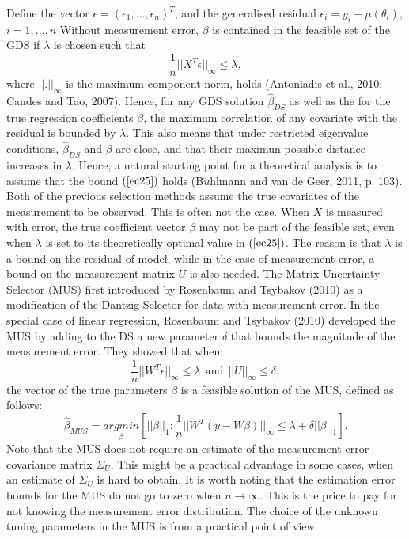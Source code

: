 \documentclass[a4paper,12pt,openany]{report}
\theoremstyle{plain}
\theoremstyle{plain}
\theoremstyle{plain}
\theoremstyle{plain}
\theoremstyle{plain}
\theoremstyle{plain}
\theoremstyle{plain}
\theoremstyle{plain}
\theoremstyle{plain}
\theoremstyle{plain}
\theoremstyle{plain}
\theoremstyle{plain}
\begin{document}
Define the vector $\epsilon = (\epsilon_1, \dots, \epsilon_n)^T$, and the generalised residual $\epsilon_i = y_i-\mu(\theta_i)$, $i=1,\dots, n$ Without measurement error, $\beta$ is contained in the feasible set of the GDS if $\lambda$ is chosen such that
\begin{equation}\label{ec25}
\frac{1}{n}||X^T\epsilon||_{\infty}\leq \lambda,
\end{equation}
where $||.||_{\infty}$ is the maximum component norm, holds (Antoniadis et al., 2010; Candes and Tao, 2007). Hence, for any GDS solution $\hat{\beta}_{DS}$ as well as the for the true regression coefficients $\beta$, the maximum correlation of any covariate with the residual is bounded by $\lambda$. This also means that under restricted eigenvalue conditions, $\hat{\beta}_{DS}$ and $\beta$ are close, and that their maximun possible distance increases in $\lambda$. Hence, a natural starting point for a theoretical analysis is to assume that the bound $(\ref{ec25})$ holds (B$\ddot{u}$hlmann and van de Geer, 2011, p. 103).  Both of the previous selection methods assume the true covariates of the measurement to be observed.  This is often not the case. When $X$ is measured with error, the true coefficient vector $\beta$ may not be part of the feasible set, even when $\lambda$ is set to its theoretically optimal value in $(\ref{ec25})$. The reason is that $\lambda$ is a bound on the residual of model, while in the case of measurement error, a bound on the measurement matrix $U$ is also needed. The Matrix Uncertainty Selector (MUS) first introduced by Rosenbaum and Tsybakov (2010) as a modification of the Dantzig Selector for data with measurement error. In the special case of linear regression, Rosenbaum and Tsybakov (2010) developed the MUS by adding to the DS a new parameter $\delta$ that bounds the magnitude of the measurement error. They showed that when:
\begin{equation}\label{eq:bound}
\frac{1}{n}||W^T\epsilon||_{\infty}\leq \lambda \ \ \text{and} \ \  ||U||_{\infty} \leq \delta,
\end{equation}
the vector of the true parameters $\beta$ is a feasible solution of the MUS, defined as follows:
\begin{equation}
\hat{\beta}_{MUS} = \underset{\beta}{argmin}\left[||\beta||_1 :  \frac{1}{n}||W^T(y-W\beta)||_{\infty} \leq \lambda + \delta||\beta||_1\right]. 
\end{equation}
Note that the MUS does not require an estimate of the measurement error covariance matrix $\Sigma_U$. This
might be a practical advantage in some cases, when an estimate of $\Sigma_U$ is hard to obtain. It is worth noting that the estimation error bounds for the MUS do not go to zero when $n\to\infty$. This is the price to pay for not knowing the measurement error distribution. The choice of the unknown tuning parameters in the MUS is from a practical point of view
\end{document}
